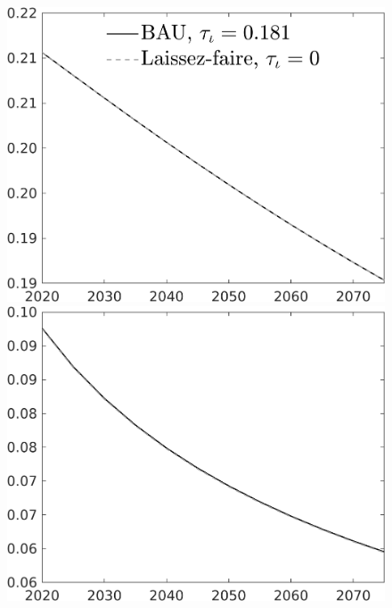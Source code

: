 \documentclass[12pt]{article}
\begin{document}
\begin{figure}[h!!]
\begin{minipage}[]{0.32\textwidth}
	\end{minipage}	
	\begin{minipage}[]{0.32\textwidth}
		\includegraphics[width=1\textwidth]{../../codding_model/own_basedOnFried/optimalPol_010922_revision/figures/all_13Sept22/CompTaul_Equlab_LFBAU_Reg0_pf_spillover0_nsk0_xgr1_knspil0_sep1_countec0_GovRev0_etaa0.79_lgd1.png}
	\end{minipage}	
	\begin{minipage}[]{0.32\textwidth}
		\includegraphics[width=1\textwidth]{../../codding_model/own_basedOnFried/optimalPol_010922_revision/figures/all_13Sept22/CompTaul_Equlab_LFBAU_Reg0_pee_spillover0_nsk0_xgr1_knspil0_sep1_countec0_GovRev0_etaa0.79_lgd0.png}

\end{minipage}
\end{figure}
\end{document}
